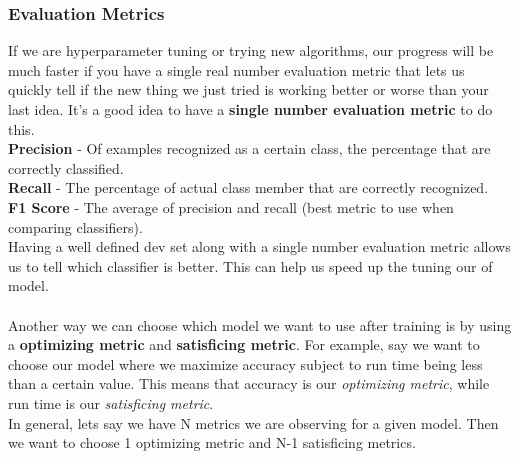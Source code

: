 \documentclass[11pt, a4paper]{article}
\begin{document}
\begin{spacing}{1.1}
	\subsubsection{Evaluation Metrics}
	If we are hyperparameter tuning or trying new algorithms, our progress will be much faster if you have a single real number evaluation metric that lets us quickly tell if the new thing we just tried is working better or worse than your last idea. It's a good idea to have a \textbf{single number evaluation metric} to do this. \vspace*{1.5mm} \\
	\textbf{Precision} - Of examples recognized as a certain class, the percentage that are correctly classified. \\
	\textbf{Recall} - The percentage of actual class member that  are correctly recognized. \\
	\textbf{F1 Score} - The average of precision and recall (best metric to use when comparing classifiers). \vspace*{1.5mm} \\
	Having a well defined dev set along with a single number evaluation metric allows us to tell which classifier is better. This can help us speed up the tuning our of model. \\~\\
	Another way we can choose which model we want to use after training is by using a \textbf{optimizing metric} and \textbf{satisficing metric}. For example, say we want to choose our model where we maximize accuracy subject to run time being less than a certain value. This means that accuracy is our \textit{optimizing metric}, while run time is our \textit{satisficing metric}. \vspace*{.5mm} \\
	In general, lets say we have N metrics we are observing for a given model. Then we want to choose 1 optimizing metric and N-1 satisficing metrics.
	

\end{spacing}
\end{document}
